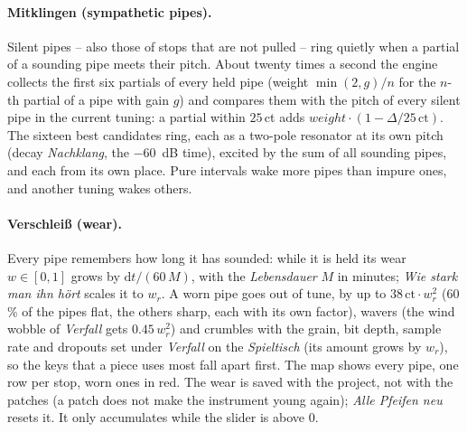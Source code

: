 \documentclass[11pt,a4paper,parskip=half,DIV=11,toc=bibliography]{scrartcl}
\newcommand{\ui}[1]{\emph{#1}}                 %
\begin{document}
\paragraph{Mitklingen (sympathetic pipes).} Silent pipes -- also those of stops that are not pulled -- ring quietly when a partial of a
sounding pipe meets their pitch. About twenty times a second the engine collects the first six partials of every held pipe
(weight $\min(2,g)/n$ for the $n$-th partial of a pipe with gain $g$) and compares them with the pitch of every silent pipe in the
current tuning: a partial within $25$\,ct adds $\mathit{weight}\cdot(1-\Delta/25\,\mathrm{ct})$. The sixteen best candidates ring,
each as a two-pole resonator at its own pitch (decay \ui{Nachklang}, the \SI{-60}{dB} time), excited by the sum of all
sounding pipes, and each from its own place. Pure intervals wake more pipes than impure ones, and another tuning wakes others.

\paragraph{Verschleiß (wear).} Every pipe remembers how long it has sounded: while it is held its wear $w\in[0,1]$ grows by
$\mathrm{d}t/(60\,M)$, with the \ui{Lebensdauer} $M$ in minutes; \ui{Wie stark man ihn hört} scales it to $w_r$. A worn pipe goes out
of tune, by up to $38\,\mathrm{ct}\cdot w_r^2$ (60\,\% of the pipes flat, the others sharp, each with its own factor), wavers
(the wind wobble of \ui{Verfall} gets $0.45\,w_r^2$) and crumbles with the grain, bit depth, sample rate and dropouts set under
\ui{Verfall} on the \ui{Spieltisch} (its amount grows by $w_r$), so the keys that a piece uses most fall apart first. The map shows
every pipe, one row per stop, worn ones in red. The wear is saved with the project, not with the patches (a patch does not make
the instrument young again); \ui{Alle Pfeifen neu} resets it. It only accumulates while the slider is above 0.
\end{document}
